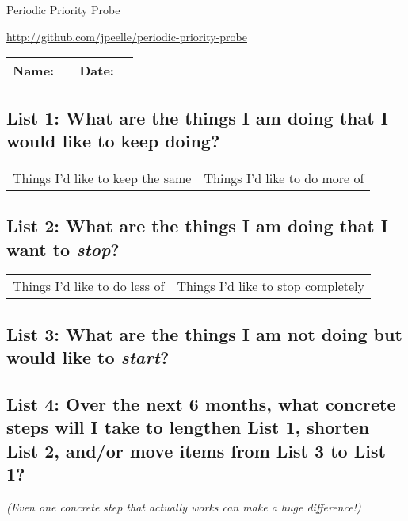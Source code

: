 \documentclass[letterpaper,oneside,11pt,article, portrait]{memoir}
\begin{document}
\pagestyle{empty}


\begin{centering}

{\Large Periodic Priority Probe}

\small{\url{http://github.com/jpeelle/periodic-priority-probe}}

\end{centering}

\vspace{.2in}

\noindent \begin{tabularx}{\textwidth}{ l X l X}
Name:& &Date:& \\
\hline
\end{tabularx}

\vspace{.2in}


\subsection{List 1: What are the things I am doing that I would like to keep doing?}

\begin{tabularx}{\textwidth}{>{\centering\small}X | >{\centering\small}X}
Things I'd like to keep the same& Things I'd like to do more of\\
\end{tabularx}


\vspace{1.3in}

\subsection{List 2: What are the things I am doing that I want to {\itshape stop}?}

\begin{tabularx}{\textwidth}{>{\centering\small}X | >{\centering\small}X}
Things I'd like to do less of& Things I'd like to stop completely\\
\end{tabularx}

\vspace{1.3in}

\subsection{List 3: What are the things I am not doing but would like to {\itshape start}?}
\vspace{1in} %

\subsection{List 4: Over the next 6 months, what concrete steps will I take to lengthen List 1, shorten List 2, and/or move items from List 3 to List 1?}
\small{\itshape{(Even one concrete step that actually works can make a huge difference!)}}
\end{document}
